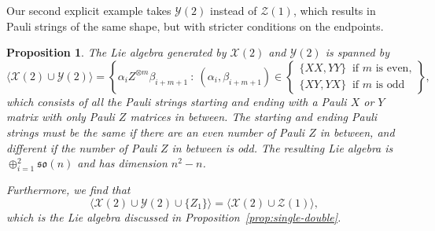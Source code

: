 \documentclass[12pt, a4-paper]{amsart}
\newcommand{\cX}{\mathcal{X}}
\newcommand{\cY}{\mathcal{Y}}
\newcommand{\cZ}{\mathcal{Z}}
\newcommand{\mf}[1]{\mathfrak{#1}}
\numberwithin{equation}{section}
\newtheorem{proposition}[lemma]{Proposition}
\begin{document}
Our second explicit example takes $\cY(2)$ instead of $\cZ(1)$, which results in Pauli strings of the same shape, but with stricter conditions on the endpoints.
\begin{proposition}\label{prop:double-double}
    The Lie algebra generated by $\cX(2)$ and $\cY(2)$ is spanned by
    \begin{equation}
            \langle \cX(2) \cup \cY(2) \rangle = \left\{\alpha_i Z^{\otimes m} \beta_{i+m+1} ~:~ 
                (\alpha_i, \beta_{i+m+1}) \in \begin{cases}
                \{XX, YY\} ~\text{ if $m$ is even,} \\ 
                \{XY, YX\} ~\text{ if $m$ is odd}
            \end{cases}
            \right\},
    \end{equation}
    which consists of all the Pauli strings starting and ending with a Pauli $X$ or $Y$ matrix with only Pauli $Z$ matrices in between. The starting and ending Pauli strings must be the same if there are an even number of Pauli $Z$ in between, and different if the number of Pauli $Z$ in between is odd. The resulting Lie algebra is $\oplus_{i=1}^2 \mf{so}(n)$ \cite{Aguilar2024FullClassificationLie} and has dimension $n^2-n$.

    Furthermore, we find that
    \begin{equation}
        \langle \cX(2) \cup \cY(2) \cup \{Z_1\} \rangle = \langle \cX(2) \cup \cZ(1)\rangle,
    \end{equation}
    which is the Lie algebra discussed in Proposition~\ref{prop:single-double}.
\end{proposition}
\end{document}
